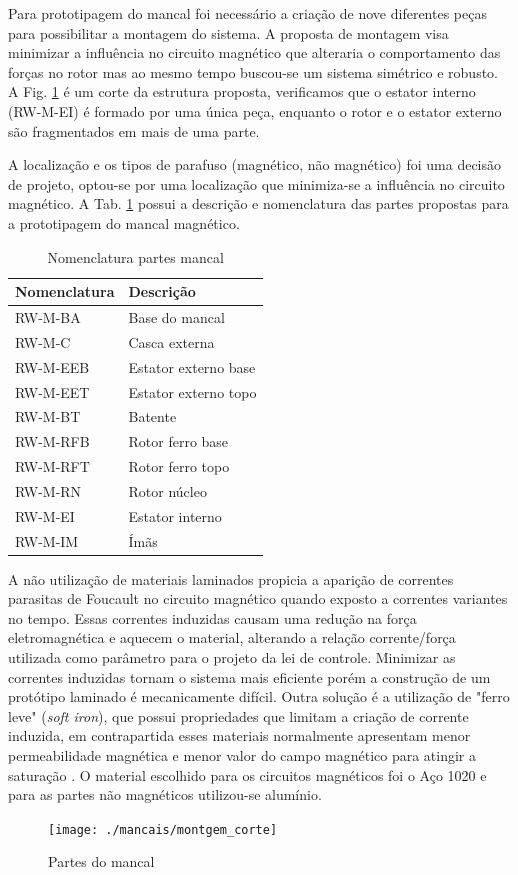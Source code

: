 Para prototipagem do mancal foi necessário a criação de nove diferentes peças para possibilitar a montagem do sistema. A proposta de montagem visa minimizar a influência no circuito magnético que alteraria o comportamento das forças no rotor mas ao mesmo tempo buscou-se um sistema simétrico e robusto.  A Fig. \ref{fig:montgem:corte} é um corte da estrutura proposta, verificamos que o estator interno (RW-M-EI) é formado por uma única peça, enquanto o rotor e o estator externo são fragmentados em mais de uma parte.

A localização e os tipos de parafuso (magnético, não magnético) foi uma decisão de projeto, optou-se por uma localização que minimiza-se a influência no circuito magnético. A Tab. \ref{Tab:nomenclatura:mancal} possui a descrição e nomenclatura das partes propostas para a prototipagem do mancal magnético.

 \begin{table}[ht!]
 	\centering
 	\begin{tabular}{l l}
 		Nomenclatura & Descrição  \\ \hline
 		RW-M-BA 		&	Base do mancal \\
 		RW-M-C   		 &	Casca externa\\
 		RW-M-EEB	  & Estator externo base\\
 		RW-M-EET & 	Estator externo topo\\
 		RW-M-BT & 	Batente\\
 		RW-M-RFB & 	Rotor ferro base\\
 		RW-M-RFT	&  Rotor ferro topo\\
 		RW-M-RN & 	Rotor núcleo\\
 		RW-M-EI	&  Estator interno\\
		RW-M-IM	&  Ímãs 
 	\end{tabular} 
 	\caption{Nomenclatura partes mancal}
 	\label{Tab:nomenclatura:mancal} 
 \end{table} 

 
A não utilização de materiais laminados propicia  a aparição de correntes parasitas de Foucault no circuito magnético quando exposto a correntes variantes no tempo. Essas correntes induzidas  causam uma redução na força eletromagnética e aquecem o material, alterando a relação corrente/força utilizada como parâmetro para o projeto da lei de controle. Minimizar as correntes induzidas tornam o sistema mais eficiente porém a construção de um protótipo laminado é mecanicamente difícil. Outra solução é a utilização de "ferro leve" (\textit{soft iron}), que possui propriedades que limitam a criação de corrente induzida, em contrapartida esses materiais normalmente apresentam menor permeabilidade magnética e menor valor do campo magnético para atingir a saturação \citep{Han2013a}. O material escolhido para os circuitos magnéticos foi o Aço 1020 e para as partes não magnéticos utilizou-se alumínio.
  
\begin{figure}[th!]
\centering
\texttt{[image: ./mancais/montgem\_corte]}
\caption{Partes do mancal}
\label{fig:montgem:corte}
\end{figure} 


